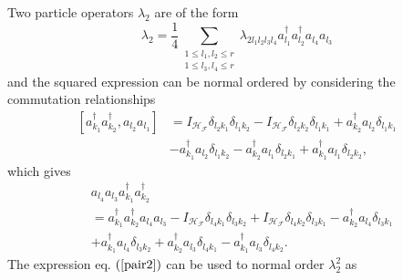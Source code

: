 \documentclass[aps,preprint]{revtex4}%
\begin{document}
Two particle operators $\lambda_{2}$ are of the form
\begin{equation}
\lambda_{2}=\frac{1}{4}\sum_{\substack{1\leq l_{1},l_{2}\leq r\\1\leq
l_{3},l_{4}\leq r}}\lambda_{2l_{1}l_{2}l_{3}l_{4}}a_{l_{1}}^{\dagger}a_{l_{2}%
}^{\dagger}a_{l_{4}}a_{l_{3}}%
\end{equation}
and the squared expression can be normal ordered by considering the
commutation relationships%
\begin{align}
\left[  a_{k_{1}}^{\dagger}a_{k_{2}}^{\dagger},a_{l_{2}}a_{l_{1}}\right]   &
=I_{\mathcal{H}_{\mathcal{F}}}\delta_{l_{2}k_{1}}\delta_{l_{1}k_{2}%
}-I_{\mathcal{H}_{\mathcal{F}}}\delta_{l_{2}k_{2}}\delta_{l_{1}k_{1}}%
+a_{k_{2}}^{\dagger}a_{l_{2}}\delta_{l_{1}k_{1}}\nonumber\\
&  -a_{k_{1}}^{\dagger}a_{l_{2}}\delta_{l_{1}k_{2}}-a_{k_{2}}^{\dagger
}a_{l_{1}}\delta_{l_{2}k_{1}}+a_{k_{1}}^{\dagger}a_{l_{1}}\delta_{l_{2}k_{2}},
\label{pair1}%
\end{align}
which gives%
\begin{align}
&  a_{l_{4}}a_{l_{3}}a_{k_{1}}^{\dagger}a_{k_{2}}^{\dagger}\nonumber\\
&  =a_{k_{1}}^{\dagger}a_{k_{2}}^{\dagger}a_{l_{4}}a_{l_{3}}-I_{\mathcal{H}%
_{\mathcal{F}}}\delta_{l_{4}k_{1}}\delta_{l_{3}k_{2}}+I_{\mathcal{H}%
_{\mathcal{F}}}\delta_{l_{4}k_{2}}\delta_{l_{3}k_{1}}-a_{k_{2}}^{\dagger
}a_{l_{4}}\delta_{l_{3}k_{1}}\nonumber\\
&  +a_{k_{1}}^{\dagger}a_{l_{4}}\delta_{l_{3}k_{2}}+a_{k_{2}}^{\dagger
}a_{l_{3}}\delta_{l_{4}k_{1}}-a_{k_{1}}^{\dagger}a_{l_{3}}\delta_{l_{4}k_{2}}.
\label{pair2}%
\end{align}
The expression eq. $\left(  \ref{pair2}\right)  $ can be used to normal order
$\lambda_{2}^{2}$ as
\end{document}
